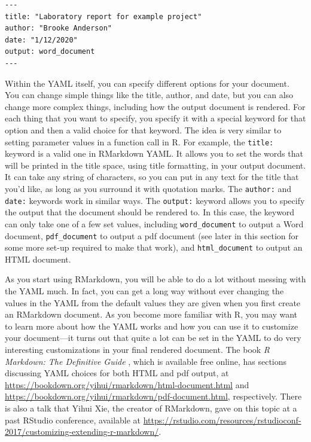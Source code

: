 \documentclass[]{tufte-book}
\begin{document}
\begin{verbatim}
---
title: "Laboratory report for example project"
author: "Brooke Anderson"
date: "1/12/2020"
output: word_document
---
\end{verbatim}

Within the YAML itself, you can specify different options for your document.
You can change simple things like the title, author, and date, but you can
also change more complex things, including how the output document is rendered.
For each thing that you want to specify, you specify it with a special
keyword for that option and then a valid choice for that keyword. The idea
is very similar to setting parameter values in a function call in R. For
example, the \texttt{title:} keyword is a valid one in RMarkdown YAML. It allows you
to set the words that will be printed in the title space, using title formatting,
in your output document. It can take any string of characters, so you can put in
any text for the title that you'd like, as long as you surround it with quotation
marks. The \texttt{author:} and \texttt{date:} keywords work in similar ways. The \texttt{output:}
keyword allows you to specify the output that the document should be rendered to.
In this case, the keyword can only take one of a few set values, including
\texttt{word\_document} to output a Word document, \texttt{pdf\_document} to output a pdf
document (see later in this section for some more set-up required to make that
work), and \texttt{html\_document} to output an HTML document.

As you start using RMarkdown, you will be able to do a lot without messing with
the YAML much. In fact, you can get a long way without ever changing the values
in the YAML from the default values they are given when you first create an
RMarkdown document. As you become more familiar with R, you may want to learn
more about how the YAML works and how you can use it to customize your
document---it turns out that quite a lot can be set in the YAML to do very
interesting customizations in your final rendered document. The book \emph{R
Markdown: The Definitive Guide} \citep{xie2018r}, which is available free online, has
sections discussing YAML choices for both HTML and pdf output, at
\url{https://bookdown.org/yihui/rmarkdown/html-document.html} and
\url{https://bookdown.org/yihui/rmarkdown/pdf-document.html}, respectively. There is
also a talk that Yihui Xie, the creator of RMarkdown, gave on this topic at a
past RStudio conference, available at
\url{https://rstudio.com/resources/rstudioconf-2017/customizing-extending-r-markdown/}.
\end{document}
